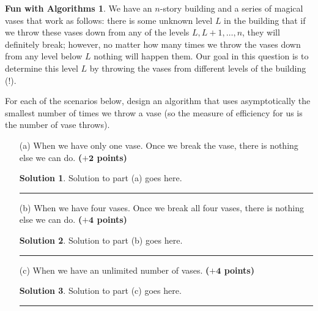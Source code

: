 \documentclass{article}
\theoremstyle{definition}
\newtheorem*{fun}{Fun with Algorithms}
\def\fline{\rule{0.75\linewidth}{0.5pt}}
\newcommand{\finishline}{\begin{center}\fline\end{center}}
\newtheorem*{solution*}{Solution}
\newenvironment{solution}{\begin{solution*}}{{\finishline} \end{solution*}}
\newcommand{\grade}[1]{\hfill{\textbf{($\mathbf{#1}$ points)}}}
\begin{document}
\begin{fun}
	We have an $n$-story building and a series of magical vases that work as follows: there is some unknown level $L$ in the building that if we throw these vases down from any of the levels $L,L+1,\ldots,n$, they will definitely break; however, 
	no matter how many times we throw the vases down from any level below $L$ nothing will happen them. Our goal in this question is to determine this level $L$ by throwing the vases from different levels of the building (!). 
	
	For each of the scenarios below, design an algorithm that uses asymptotically the smallest number of times we throw a vase (so the measure of efficiency for us is the number of vase throws). 
	\begin{enumerate}
	\item[(a)] When we have only one vase. Once we break the vase, there is nothing else we can do. \grade{+2} 
	
	
    		    \begin{solution}
	Solution to part (a) goes here. %
\end{solution}


	\item[(b)] When we have  four vases. Once we break all four vases, there is nothing else we can do. \grade{+4} 
	
	
    		    \begin{solution}
	Solution to part (b) goes here. %
\end{solution}


	\item[(c)] When we have an unlimited number of vases.  \grade{+4} 
	
	
    		    \begin{solution}
	Solution to part (c) goes here. %
\end{solution}


	\end{enumerate}
\end{fun}
\end{document}
